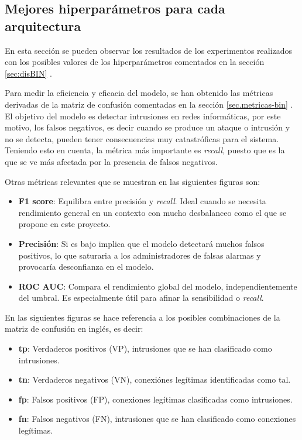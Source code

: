 \subsection{Mejores hiperparámetros para cada arquitectura}
En esta sección se pueden observar los resultados de los experimentos realizados con los posibles valores de los hiperparámetros comentados en la sección \ref{sec:disBIN} .

Para medir la eficiencia y eficacia del modelo, se han obtenido las métricas derivadas de la matriz de confusión comentadas en la sección \ref{sec.metricas-bin} . El objetivo del modelo es detectar intrusiones en redes informáticas, por este motivo, los falsos negativos, es decir cuando se produce un ataque o intrusión y no se detecta, pueden tener consecuencias muy catastróficas para el sistema. Teniendo esto en cuenta, la métrica más importante es \textit{recall}, puesto que es la que se ve más afectada por la presencia de falsos negativos.

Otras métricas relevantes que se muestran en las siguientes figuras son:
\begin{itemize}
	\item \textbf{F1 score}: Equilibra entre precisión y \textit{recall}. Ideal cuando se necesita rendimiento general en un contexto con mucho desbalanceo como el que se propone en este proyecto.
	\item \textbf{Precisión}: Si es bajo implica que el modelo detectará muchos falsos positivos, lo que saturaria a los administradores de falsas alarmas y provocaría desconfianza en el modelo.
	\item \textbf{ROC AUC}: Compara el rendimiento global del modelo, independientemente del umbral. Es especialmente útil para afinar la sensibilidad o \textit{recall}.
\end{itemize}

En las siguientes figuras se hace referencia a los posibles combinaciones de la matriz de confusión en inglés, es decir:
\begin{itemize}
	\item \textbf{tp}: Verdaderos positivos (VP), intrusiones que se han clasificado como intrusiones.
	\item \textbf{tn}: Verdaderos negativos (VN), conexiónes legítimas identificadas como tal.
	\item \textbf{fp}: Falsos positivos (FP), conexiones legítimas clasificadas como intrusiones.
	\item \textbf{fn}: Falsos negativos (FN), intrusiones que se han clasificado como conexiones legítimas.
\end{itemize}

